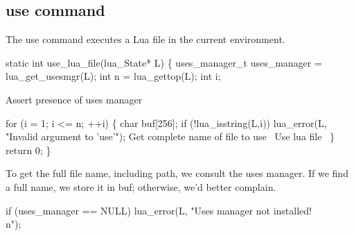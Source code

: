 \nwendcode{}\nwdocspar


\subsection{{\Tt{}use\nwendquote} command}

The {\Tt{}use\nwendquote} command executes a Lua file in the current environment.

\nwenddocs{}\endmoddef\nwstartdeflinemarkup{}\nwenddeflinemarkup
static int use_lua_file(lua_State* L)
\{
    uses_manager_t uses_manager = lua_get_usesmgr(L);
    int n = lua_gettop(L);
    int i;

    \LA{}Assert presence of uses manager~{\nwtagstyle{}}\RA{}

    for (i = 1; i <= n; ++i) \{
        char buf[256];
        if (!lua_isstring(L,i))
            lua_error(L, "Invalid argument to 'use'");
        \LA{}Get complete name of file to use~{\nwtagstyle{}}\RA{}
        \LA{}Use lua file~{\nwtagstyle{}}\RA{}
    \}
    return 0;
\}

\nwendcode{}\nwdocspar

To get the full file name, including path, we consult 
the uses manager.  If we find a full name, we store it in {\Tt{}buf\nwendquote};
otherwise, we'd better complain.

\nwenddocs{}\endmoddef\nwstartdeflinemarkup{}\nwenddeflinemarkup
if (uses_manager == NULL)
    lua_error(L, "Uses manager not installed!\\n");
\nwendcode{}\nwdocspar

